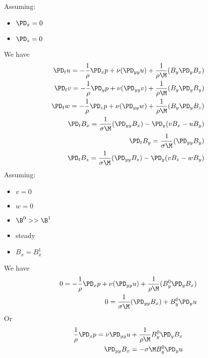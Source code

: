 \documentclass[11pt]{article}
\begin{document}
\normalsize
Assuming:
\begin{itemize}\setlength\itemsep{-1em}
	\item $\PD_x=0$
	\item $\PD_z=0$
\end{itemize}
We have
\begin{equation}\begin{aligned}
\PD_t u = -\frac{1}{\rho}\PD_x p+ \nu (\PD_{yy} u) + \frac{1}{\rho \M} (B_y \PD_y B_x) \\
\PD_t v = -\frac{1}{\rho}\PD_y p+ \nu (\PD_{yy} v) + \frac{1}{\rho \M} (B_y \PD_y B_y) \\
\PD_t w = -\frac{1}{\rho}\PD_z p+ \nu (\PD_{yy} w) + \frac{1}{\rho \M} (B_y \PD_y B_z) \\
\PD_t B_x = \frac{1}{\sigma \M} (\PD_{yy} B_x)  - \PD_y (v B_x - u B_y) \\
\PD_t B_y = \frac{1}{\sigma \M} (\PD_{yy} B_y)                          \\
\PD_t B_z = \frac{1}{\sigma \M} (\PD_{yy} B_z)  - \PD_y (v B_z - w B_y) \\
\end{aligned} \end{equation}
Assuming:
\begin{itemize}\setlength\itemsep{-1em}
	\item $v=0$
	\item $w=0$
	\item $\B^0>>\B^1$
	\item steady
	\item $B_x = B_x^1$
\end{itemize}
We have
\begin{equation}\begin{aligned}
0 = -\frac{1}{\rho}\PD_x p+ \nu (\PD_{yy} u) + \frac{1}{\rho \M} (B_y^0 \PD_y B_x) \\
0 = \frac{1}{\sigma \M} (\PD_{yy} B_x)  + B_y^0 \PD_y u \\
\end{aligned} \end{equation}
Or
\begin{equation}\begin{aligned}
\frac{1}{\rho}\PD_x p = \nu \PD_{yy} u + \frac{1}{\rho \M} B_y^0 \PD_y B_x \\
\PD_{yy} B_x = - \sigma \M B_y^0 \PD_y u \\
\end{aligned} \end{equation}
\end{document}
